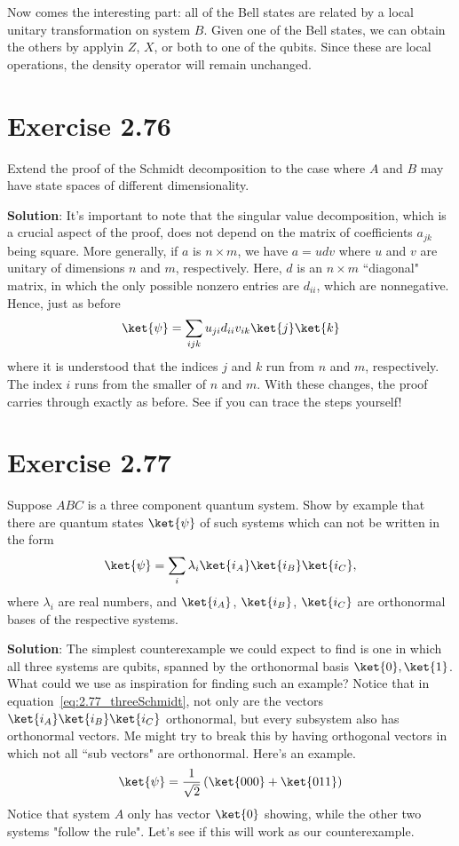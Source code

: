 \documentclass{book}
\begin{document}
    Now comes the interesting part: all of the Bell states are related by a local unitary transformation on system $B$. Given one of the Bell states, we can obtain the others by applyin $Z$, $X$, or both to one of the qubits. Since these are local operations, the density operator will remain unchanged. 

\section*{Exercise 2.76}
    Extend the proof of the Schmidt decomposition to the case where $A$ and $B$ may have state spaces of different dimensionality. 

    \textbf{Solution}: It's important to note that the singular value decomposition, which is a crucial aspect of the proof, does not depend on the matrix of coefficients $a_{jk}$ being square. More generally, if $a$ is $n \times m$, we have $a = udv$ where $u$ and $v$ are unitary of dimensions $n$ and $m$, respectively. Here, $d$ is an $n \times m$ ``diagonal" matrix, in which the only possible nonzero entries are $d_{ii}$, which are nonnegative. Hence, just as before
    \begin{align}
        \ket{\psi} = \sum_{ijk} u_{ji} d_{ii} v_{ik} \ket{j}\ket{k}
    \end{align}
    where it is understood that the indices $j$ and $k$ run from $n$ and $m$, respectively. The index $i$ runs from the smaller of $n$ and $m$. With these changes, the proof carries through exactly as before. See if you can trace the steps yourself!

\section*{Exercise 2.77}
    Suppose $ABC$ is a three component quantum system. Show by example that there are quantum states $\ket{\psi}$ of such systems which can not be written in the form
    \begin{align} \label{eq:2.77_threeSchmidt}
        \ket{\psi} = \sum_{i} \lambda_i \ket{i_A} \ket{i_B}\ket{i_C},
    \end{align}
    where $\lambda_i$ are real numbers, and $\ket{i_A}$, $\ket{i_B}$, $\ket{i_C}$ are orthonormal bases of the respective systems.

    \textbf{Solution}: The simplest counterexample we could expect to find is one in which all three systems are qubits, spanned by the orthonormal basis $\ket{0}, \ket{1}$. What could we use as inspiration for finding such an example? Notice that in equation~\eqref{eq:2.77_threeSchmidt}, not only are the vectors $\ket{i_A} \ket{i_B}\ket{i_C}$ orthonormal, but every subsystem also has orthonormal vectors. Me might try to break this by having orthogonal vectors in which not all ``sub vectors" are orthonormal. Here's an example.
    \begin{align} \label{eq:2.77counterexample}
        \ket{\psi} = \frac{1}{\sqrt{2}} \left(\ket{000} + \ket{011}\right)
    \end{align}
    Notice that system $A$ only has vector $\ket{0}$ showing, while the other two systems "follow the rule". Let's see if this will work as our counterexample. 
\end{document}
